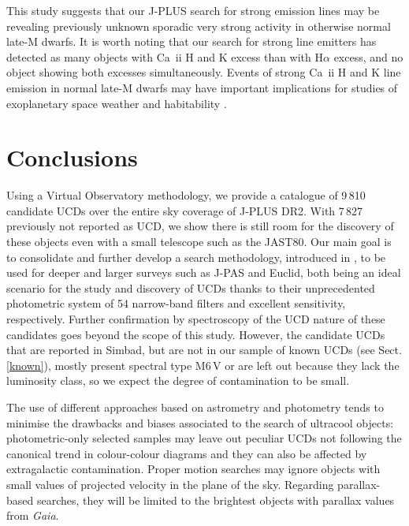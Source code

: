 This study suggests that our J-PLUS search for strong emission lines may be revealing previously unknown sporadic very strong activity in otherwise normal late-M dwarfs. It is worth noting that our search for strong line emitters has detected as many objects with Ca~{\sc ii} H and K excess than with H$\alpha$ excess, and no object showing both excesses simultaneously. Events of strong Ca~{\sc ii} H and K line emission in normal late-M dwarfs may have important implications for studies of
exoplanetary space weather and habitability \citep{Yamashiki2019}.




\section{Conclusions} \label{conclusions}

Using a Virtual Observatory methodology, we provide a catalogue of 9\,810 candidate UCDs over the entire sky coverage of J-PLUS DR2. With 7\,827 previously not reported as UCD, we show there is still room for the discovery of these objects even with a small telescope such as the JAST80. Our main goal is to consolidate and further develop a search methodology, introduced in \citet{solano2019}, to be used for deeper and larger surveys such as J-PAS and Euclid, both being an ideal scenario for the study and discovery of UCDs thanks to their unprecedented photometric system of 54 narrow-band filters and excellent sensitivity, respectively. Further confirmation by spectroscopy of the UCD nature of these candidates goes beyond the scope of this study. However, the candidate UCDs that are reported in Simbad, but are not in our sample of known UCDs (see Sect. \ref{known}), mostly present spectral type M6\,V or are left out because they lack the luminosity class, so we expect the degree of contamination to be small.

The use of different approaches based on astrometry and photometry tends to minimise the drawbacks and biases associated to the search of ultracool objects: photometric-only selected samples may leave out peculiar UCDs not following the canonical trend in colour-colour diagrams and they can also be affected by extragalactic contamination. Proper motion searches may ignore objects with small values of projected velocity in the plane of the sky. Regarding parallax-based searches, they will be limited to the brightest objects with parallax values from \textit{Gaia}.

